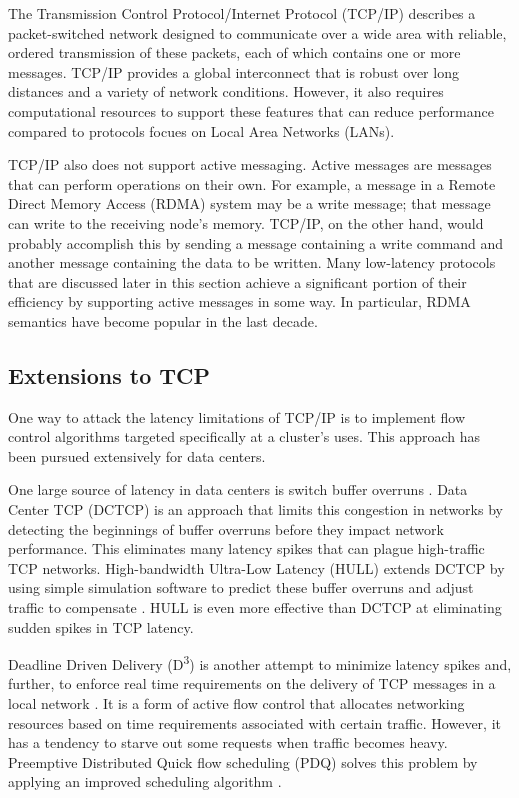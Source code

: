 \documentclass[11pt]{book}
\begin{document}
The Transmission Control Protocol/Internet Protocol (TCP/IP) describes a packet-switched
network designed to communicate over a wide area with reliable, ordered
transmission of these packets, each of which contains one or more
messages. TCP/IP provides a global interconnect that is robust over long
distances and a variety of network conditions. However, it also requires
computational resources to support these features that can reduce performance
compared to protocols focues on Local Area Networks (LANs).

TCP/IP also does not support active messaging. Active messages are messages that
can perform operations on their own. For example, a message in a Remote Direct
Memory Access (RDMA) system may be a write message; that message can write to
the receiving node's memory. TCP/IP, on the other hand, would probably accomplish
this by sending a message containing a write command and another message
containing the data to be written. Many low-latency protocols that are discussed
later in this section achieve a significant portion of their efficiency by
supporting active messages in some way. In particular, RDMA semantics have
become popular in the last decade.

\subsection{\textbf{Extensions to TCP}}

One way to attack the latency limitations of TCP/IP is to implement flow control
algorithms targeted specifically at a cluster's uses. This approach has been
pursued extensively for data centers.

One large source of latency in data centers is switch buffer overruns
\cite{liu-13}. Data Center TCP (DCTCP) is an approach that limits this
congestion in networks by detecting the beginnings of buffer overruns before they impact
network performance. This eliminates many latency spikes that can plague
high-traffic TCP networks. High-bandwidth Ultra-Low Latency (HULL) extends DCTCP
by using simple simulation software to predict these buffer overruns and adjust
traffic to compensate \cite{liu-13}. HULL is even more effective than DCTCP at
eliminating sudden spikes in TCP latency.

Deadline Driven Delivery (D\textsuperscript{3}) is another attempt to minimize latency spikes
and, further, to enforce real time requirements on the delivery of TCP messages
in a local network \cite{liu-13}. It is a form of active flow control that allocates
networking resources based on time requirements associated with certain
traffic. However, it has a tendency to starve out some requests when traffic
becomes heavy. Preemptive Distributed Quick flow scheduling (PDQ) solves this
problem by applying an improved scheduling algorithm \cite{liu-13}.
\end{document}
